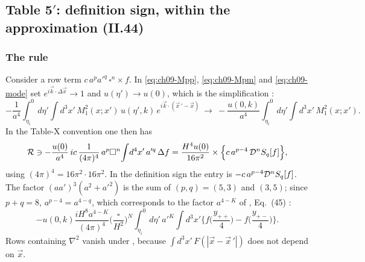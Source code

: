 \subsection{Table 5\texorpdfstring{$'$}{'}: definition sign, within the approximation (II.44)}
\label{sec:t18-tab5}

\subsubsection{The rule}
Consider a row term $c\,a^pa'^q\,\square^n\times f$. In \eqref{eq:ch09-Mpp}, \eqref{eq:ch09-Mpm} and \eqref{eq:ch09-mode} set $e^{i\vec k\cdot\Delta\vec x}\to1$
and $u(\eta')\to u(0)$, which is the simplification  \tP:
\begin{equation*}
-\frac1{a^4}\int_{\eta_i}^0\!d\eta'\!\int\!d^3x'\,M^2_1(x;x')\,u(\eta',k)\,e^{i\vec k\cdot(\vec x\,'-\vec x)}\ \longrightarrow\ -\frac{u(0,k)}{a^4}\int_{\eta_i}^0\!d\eta'\!\int\!d^3x'\,M^2_1(x;x').
\end{equation*}
In the Table-X convention one then has \tD
\begin{equation}
\mathcal{R}\ni-\frac{u(0)}{a^4}\,ic\,\frac{1}{(4\pi)^4}\,a^p\square^n\!\int\! d^4x'\,a'^q\,\Delta f=\frac{H^4u(0)}{16\pi^2}\times\Big\{c\,a^{p-4}\,\mathcal{D}^nS_q[f]\Big\},
\label{eq:ch09-rule}
\end{equation}
using $(4\pi)^4=16\pi^2\cdot16\pi^2$. In the definition sign the entry is $-c\,a^{p-4}\mathcal{D}^nS_q[f]$.
The factor $(aa')^3(a^2+a'^2)$ is the sum of $(p,q)=(5,3)$ and $(3,5)$; since $p+q=8$, $a^{p-4}=a^{4-q}$, which corresponds to the factor $a^{4-K}$ of \PII, Eq.~(45) \tP:
\begin{equation*}
-u(0,k)\frac{iH^8a^{4-K}}{(4\pi)^4}\Big(\frac{\square}{H^2}\Big)^N\int_{\eta_i}^0d\eta'\,a'^K\!\int d^3x'\Big\{f\Big(\frac{y_{++}}4\Big)-f\Big(\frac{y_{+-}}4\Big)\Big\}.
\end{equation*}
Rows containing $\nabla^2$ vanish under , because $\int d^3x'\,F(|\vec x-\vec x\,'|)$ does not depend on $\vec x$.

